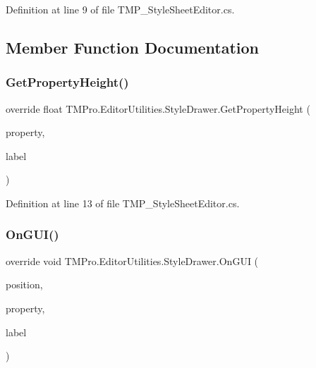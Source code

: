 Definition at line 9 of file T\+M\+P\+\_\+\+Style\+Sheet\+Editor.\+cs.



\subsection{Member Function Documentation}
\mbox{\label{class_t_m_pro_1_1_editor_utilities_1_1_style_drawer_a1dade7a00c8cfd28ebbdfd5bb86b785a}} 
\subsubsection{\texorpdfstring{GetPropertyHeight()}{GetPropertyHeight()}}
{\footnotesize\ttfamily override float T\+M\+Pro.\+Editor\+Utilities.\+Style\+Drawer.\+Get\+Property\+Height (\begin{DoxyParamCaption}\item[{Serialized\+Property}]{property,  }\item[{G\+U\+I\+Content}]{label }\end{DoxyParamCaption})}



Definition at line 13 of file T\+M\+P\+\_\+\+Style\+Sheet\+Editor.\+cs.

\mbox{\label{class_t_m_pro_1_1_editor_utilities_1_1_style_drawer_abcf27ef490de61d446ea0a1b35f3da98}} 
\subsubsection{\texorpdfstring{OnGUI()}{OnGUI()}}
{\footnotesize\ttfamily override void T\+M\+Pro.\+Editor\+Utilities.\+Style\+Drawer.\+On\+G\+UI (\begin{DoxyParamCaption}\item[{Rect}]{position,  }\item[{Serialized\+Property}]{property,  }\item[{G\+U\+I\+Content}]{label }\end{DoxyParamCaption})}



